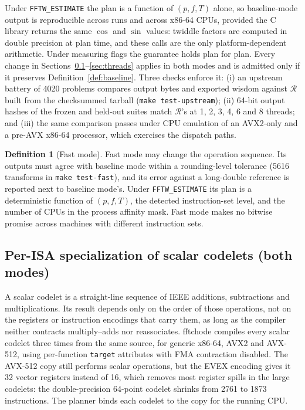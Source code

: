 \documentclass[10pt]{article}
\theoremstyle{definition}
\newtheorem{definition}{Definition}
\begin{document}
Under \texttt{FFTW\_ESTIMATE} the plan is a function of $(p,f,T)$ alone, so baseline-mode output is reproducible across runs and across x86-64 CPUs, provided the C library returns the same $\cos$ and $\sin$ values: twiddle factors are computed in double precision at plan time, and these calls are the only platform-dependent arithmetic. Under measuring flags the guarantee holds plan for plan. Every change in Sections~\ref{sec:mv}--\ref{sec:threads} applies in both modes and is admitted only if it preserves Definition~\ref{def:baseline}. Three checks enforce it: (i) an upstream battery of 4020 problems compares output bytes and exported wisdom against $\mathcal{R}$ built from the checksummed tarball (\texttt{make test-upstream}); (ii) 64-bit output hashes of the frozen and held-out suites match $\mathcal{R}$'s at 1, 2, 3, 4, 6 and 8 threads; and (iii) the same comparison passes under CPU emulation of an AVX2-only and a pre-AVX x86-64 processor, which exercises the dispatch paths.

\begin{definition}[Fast mode]\label{def:fast}
Fast mode may change the operation sequence. Its outputs must agree with baseline mode within a rounding-level tolerance (5616 transforms in \texttt{make test-fast}), and its error against a long-double reference is reported next to baseline mode's. Under \texttt{FFTW\_ESTIMATE} its plan is a deterministic function of $(p,f,T)$, the detected instruction-set level, and the number of CPUs in the process affinity mask. Fast mode makes no bitwise promise across machines with different instruction sets.
\end{definition}

\subsection{Per-ISA specialization of scalar codelets (both modes)}\label{sec:mv}

A scalar codelet is a straight-line sequence of IEEE additions, subtractions and multiplications. Its result depends only on the order of those operations, not on the registers or instruction encodings that carry them, as long as the compiler neither contracts multiply--adds nor reassociates. fftchode compiles every scalar codelet three times from the same source, for generic x86-64, AVX2 and AVX-512, using per-function \texttt{target} attributes with FMA contraction disabled. The AVX-512 copy still performs scalar operations, but the EVEX encoding gives it 32 vector registers instead of 16, which removes most register spills in the large codelets: the double-precision 64-point codelet shrinks from 2761 to 1873 instructions. The planner binds each codelet to the copy for the running CPU.
\end{document}
